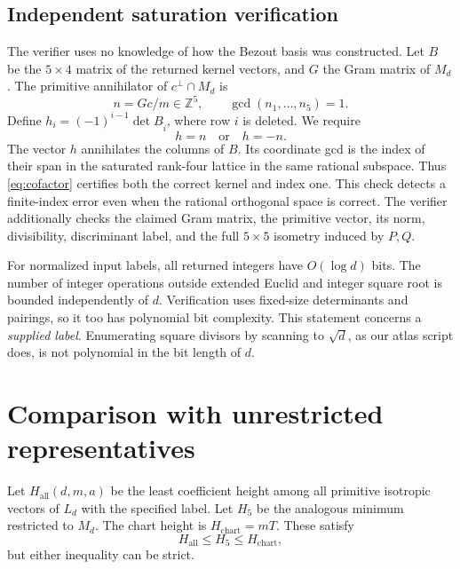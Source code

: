 \documentclass[11pt]{article}
\theoremstyle{remark}\newtheorem{remark}[theorem]{Remark}
\newcommand{\Z}{\mathbb Z}\newcommand{\Q}{\mathbb Q}\newcommand{\R}{\mathbb R}
\begin{document}
\subsection{Independent saturation verification}
The verifier uses no knowledge of how the Bezout basis was constructed. Let $B$ be the $5\times4$ matrix of the returned kernel vectors, and $G$ the Gram matrix of $M_d$. The primitive annihilator of $c^\perp\cap M_d$ is
\[
 n=Gc/m\in\Z^5,\qquad \gcd(n_1,\ldots,n_5)=1.
\]
Define $h_i=(-1)^{i-1}\det B_{\widehat i}$, where row $i$ is deleted. We require
\begin{equation}\label{eq:cofactor}
 h=n\quad\text{or}\quad h=-n.
\end{equation}
The vector $h$ annihilates the columns of $B$. Its coordinate gcd is the index of their span in the saturated rank-four lattice in the same rational subspace. Thus \eqref{eq:cofactor} certifies both the correct kernel and index one. This check detects a finite-index error even when the rational orthogonal space is correct. The verifier additionally checks the claimed Gram matrix, the primitive vector, its norm, divisibility, discriminant label, and the full $5\times5$ isometry induced by $P,Q$.

For normalized input labels, all returned integers have $O(\log d)$ bits. The number of integer operations outside extended Euclid and integer square root is bounded independently of $d$. Verification uses fixed-size determinants and pairings, so it too has polynomial bit complexity. This statement concerns a \emph{supplied label}. Enumerating square divisors by scanning to $\sqrt d$, as our atlas script does, is not polynomial in the bit length of $d$.

\section{Comparison with unrestricted representatives}
Let $H_{\mathrm{all}}(d,m,a)$ be the least coefficient height among all primitive isotropic vectors of $L_d$ with the specified label. Let $H_5$ be the analogous minimum restricted to $M_d$. The chart height is $H_{\mathrm{chart}}=mT$. These satisfy
\[
 H_{\mathrm{all}}\leq H_5\leq H_{\mathrm{chart}},
\]
but either inequality can be strict.
\end{document}
